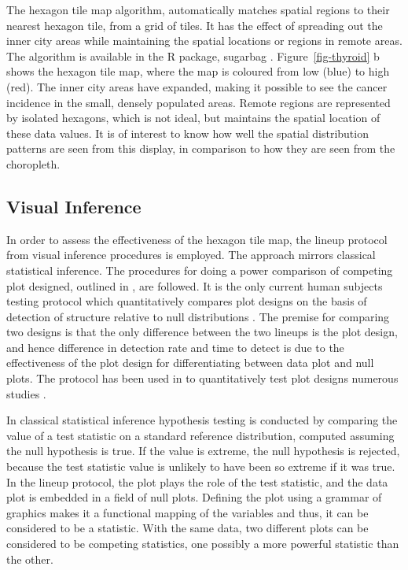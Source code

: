 \documentclass[
doublespace,
  times]{anzsauth}
\begin{document}
The hexagon tile map algorithm, automatically matches spatial regions to
their nearest hexagon tile, from a grid of tiles. It has the effect of
spreading out the inner city areas while maintaining the spatial
locations or regions in remote areas. The algorithm is available in the
R package, sugarbag \citep{sugarbag}. Figure~\ref{fig-thyroid} b shows
the hexagon tile map, where the map is coloured from low (blue) to high
(red). The inner city areas have expanded, making it possible to see the
cancer incidence in the small, densely populated areas. Remote regions
are represented by isolated hexagons, which is not ideal, but maintains
the spatial location of these data values. It is of interest to know how
well the spatial distribution patterns are seen from this display, in
comparison to how they are seen from the choropleth.

\subsection{Visual Inference}\label{visual-inference}

In order to assess the effectiveness of the hexagon tile map, the lineup
protocol \citep{BCHLLSW09, GIIV} from visual inference procedures is
employed. The approach mirrors classical statistical inference. The
procedures for doing a power comparison of competing plot designed,
outlined in \citet{GTPCCD}, are followed. It is the only current human
subjects testing protocol which quantitatively compares plot designs on
the basis of detection of structure relative to null distributions
\citep{VCH, VanderPlas2021Designing}. The premise for comparing two
designs is that the only difference between the two lineups is the plot
design, and hence difference in detection rate and time to detect is due
to the effectiveness of the plot design for differentiating between data
plot and null plots. The protocol has been used in to quantitatively
test plot designs numerous studies
\citep[e.g.][]{LHC, VH2016, KTV, RS2021}.

In classical statistical inference hypothesis testing is conducted by
comparing the value of a test statistic on a standard reference
distribution, computed assuming the null hypothesis is true. If the
value is extreme, the null hypothesis is rejected, because the test
statistic value is unlikely to have been so extreme if it was true. In
the lineup protocol, the plot plays the role of the test statistic, and
the data plot is embedded in a field of null plots. Defining the plot
using a grammar of graphics \citep{ggplot2} makes it a functional
mapping of the variables and thus, it can be considered to be a
statistic. With the same data, two different plots can be considered to
be competing statistics, one possibly a more powerful statistic than the
other.
\end{document}
